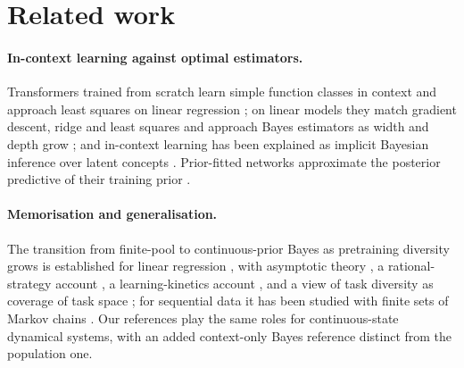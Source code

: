 \section{Related work}
\paragraph{In-context learning against optimal estimators.} Transformers trained from scratch learn simple function classes
in context and approach least squares on linear regression \citep{garg2022}; on linear models they match gradient descent,
ridge and least squares and approach Bayes estimators as width and depth grow \citep{akyurek2023}; and in-context learning
has been explained as implicit Bayesian inference over latent concepts \citep{xie2022}. Prior-fitted networks approximate the
posterior predictive of their training prior \citep{muller2022}.

\paragraph{Memorisation and generalisation.} The transition from finite-pool to continuous-prior Bayes as pretraining diversity
grows is established for linear regression \citep{raventos2023,panwar2024}, with asymptotic theory \citep{lu2025}, a
rational-strategy account \citep{wurgaft2025}, a learning-kinetics account \citep{nguyen2025}, and a view of task diversity as
coverage of task space \citep{goddard2025}; for sequential data it has been studied with finite sets of Markov chains
\citep{gibson2026,park2025}. Our references play the same roles for continuous-state dynamical systems, with an added
context-only Bayes reference distinct from the population one.


